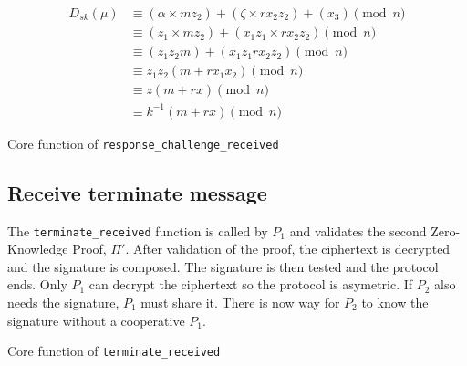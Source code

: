 \begin{equation*}
\begin{split}
  D_{sk}(\mu) &\equiv (\alpha \times mz_2) + (\zeta \times rx_2z_2) + (x_3) \pmod n \\
              &\equiv (z_1 \times mz_2) + (x_1z_1 \times rx_2z_2) \pmod n \\
              &\equiv (z_1z_2m) + (x_1z_1rx_2z_2) \pmod n \\
              &\equiv z_1z_2(m + rx_1x_2) \pmod n \\
              &\equiv z(m + rx) \pmod n \\
              &\equiv k^{-1}(m + rx) \pmod n
\end{split}
\end{equation*}

\begin{longlisting}
	\caption{Core function of \texttt{response\_challenge\_received}}
	\label{lst:implRespChallengeReceivedFunc}
\end{longlisting}

\subsection{Receive terminate message}

The \texttt{terminate\_received} function is called by $P_1$ and validates the
second Zero-Knowledge Proof, $\Pi'$. After validation of the proof, the
ciphertext is decrypted and the signature is composed. The signature is then
tested and the protocol ends. Only $P_1$ can decrypt the ciphertext so the
protocol is asymetric. If $P_2$ also needs the signature, $P_1$ must share it.
There is now way for $P_2$ to know the signature without a cooperative $P_1$.

\begin{longlisting}
	\caption{Core function of \texttt{terminate\_received}}
	\label{lst:implTerminateReceivedFunc}
\end{longlisting}
